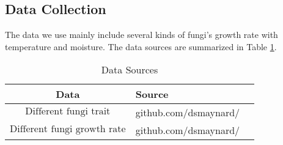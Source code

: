 	\subsection{Data Collection}
	The data we use mainly include several kinds of fungi's growth rate with temperature and moisture. The data sources are summarized in Table \ref{tb:data}.
	\begin{table}[!htbp]
	\begin{center}
		\caption{Data Sources}
		\begin{tabular}{cll}
			\toprule
			\multicolumn{1}{m{5cm}}{\centering Data}
			&\multicolumn{1}{m{5cm}}{\centering Source}\\
			\midrule
			
			$\text{Different fungi trait}$& github.com/dsmaynard/\\
			$\text{Different fungi growth rate}$& github.com/dsmaynard/\\
			
			\bottomrule
		\end{tabular}\label{tb:data}
	\end{center}	
	\end{table}